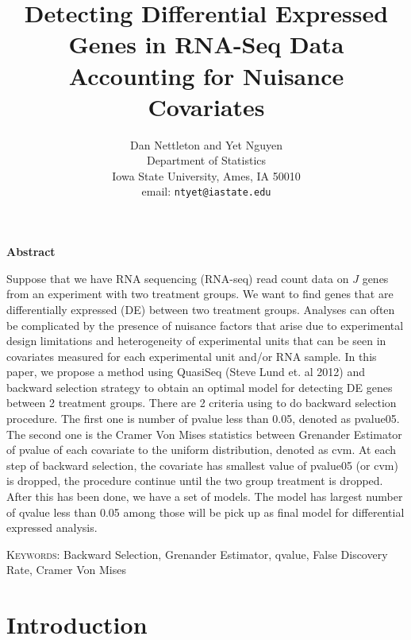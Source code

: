 \documentclass[11pt]{article}
\begin{document}
\title{Detecting Differential Expressed Genes in RNA-Seq Data \\ 
Accounting for Nuisance Covariates}
\author{Dan Nettleton  and Yet Nguyen\\
Department of Statistics \\ 
Iowa State University, Ames, IA 50010\\ 
email: \texttt{ntyet@iastate.edu} }

\maketitle



\newpage
\begin{center}
\textbf{Abstract}
\end{center}

Suppose that we have RNA sequencing (RNA-seq) read count data
on $J$ genes from an experiment with two treatment groups.
We want to find genes that are differentially expressed (DE) between
two treatment groups.
Analyses can often be complicated by the presence of nuisance factors
that arise due to experimental design limitations and heterogeneity of
experimental units that can be seen in  covariates
measured for each experimental unit and/or RNA sample. In this paper, we propose a method using QuasiSeq (Steve Lund et. al 2012) and backward selection strategy to obtain an optimal model for detecting DE genes between 2 treatment groups. 
There are 2 criteria using to do backward selection procedure. The first one is number of pvalue less than 0.05, denoted as pvalue05. The second one is the Cramer Von Mises statistics between Grenander Estimator of pvalue of each covariate to the uniform distribution, denoted as cvm. At each step of backward selection, the covariate has smallest value of pvalue05 (or cvm) is dropped, the procedure continue until the two group treatment is dropped. After this has been done, we have a set of models. The model has largest number of qvalue less than 0.05 among those will be pick up as final model for differential expressed analysis. 

\vspace*{.3in}

\noindent\textsc{Keywords}: {Backward Selection, Grenander Estimator, qvalue, False Discovery Rate, Cramer Von Mises}

\newpage

\section{Introduction}
\end{document}
